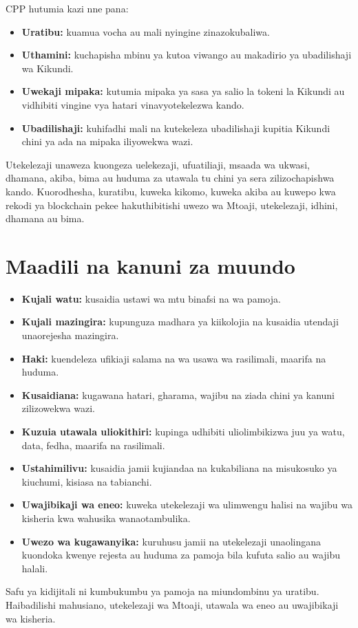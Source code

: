 \documentclass[11pt]{article}
\begin{document}
CPP hutumia kazi nne pana:

\begin{itemize}[leftmargin=*]
\item \textbf{Uratibu:} kuamua vocha au mali nyingine zinazokubaliwa.
\item \textbf{Uthamini:} kuchapisha mbinu ya kutoa viwango au makadirio ya ubadilishaji wa Kikundi.
\item \textbf{Uwekaji mipaka:} kutumia mipaka ya sasa ya salio la tokeni la Kikundi au vidhibiti vingine vya hatari vinavyotekelezwa kando.
\item \textbf{Ubadilishaji:} kuhifadhi mali na kutekeleza ubadilishaji kupitia Kikundi chini ya ada na mipaka iliyowekwa wazi.
\end{itemize}
Utekelezaji unaweza kuongeza uelekezaji, ufuatiliaji, msaada wa ukwasi, dhamana, akiba, bima au huduma za utawala tu chini ya sera zilizochapishwa kando. Kuorodhesha, kuratibu, kuweka kikomo, kuweka akiba au kuwepo kwa rekodi ya blockchain pekee hakuthibitishi uwezo wa Mtoaji, utekelezaji, idhini, dhamana au bima.

\section*{Maadili na kanuni za muundo}

\begin{itemize}[leftmargin=*]
\item \textbf{Kujali watu:} kusaidia ustawi wa mtu binafsi na wa pamoja.
\item \textbf{Kujali mazingira:} kupunguza madhara ya kiikolojia na kusaidia utendaji unaorejesha mazingira.
\item \textbf{Haki:} kuendeleza ufikiaji salama na wa usawa wa rasilimali, maarifa na huduma.
\item \textbf{Kusaidiana:} kugawana hatari, gharama, wajibu na ziada chini ya kanuni zilizowekwa wazi.
\item \textbf{Kuzuia utawala uliokithiri:} kupinga udhibiti uliolimbikizwa juu ya watu, data, fedha, maarifa na rasilimali.
\item \textbf{Ustahimilivu:} kusaidia jamii kujiandaa na kukabiliana na misukosuko ya kiuchumi, kisiasa na tabianchi.
\item \textbf{Uwajibikaji wa eneo:} kuweka utekelezaji wa ulimwengu halisi na wajibu wa kisheria kwa wahusika wanaotambulika.
\item \textbf{Uwezo wa kugawanyika:} kuruhusu jamii na utekelezaji unaolingana kuondoka kwenye rejesta au huduma za pamoja bila kufuta salio au wajibu halali.
\end{itemize}
Safu ya kidijitali ni kumbukumbu ya pamoja na miundombinu ya uratibu. Haibadilishi mahusiano, utekelezaji wa Mtoaji, utawala wa eneo au uwajibikaji wa kisheria.
\end{document}

